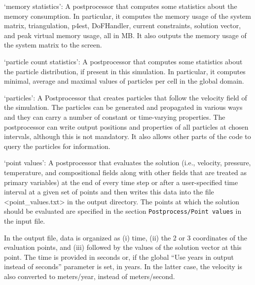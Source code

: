 \begin{itemize}
`memory statistics': A postprocessor that computes some statistics about the memory consumption. In particular, it computes the memory usage of the system matrix, triangulation, p4est, DoFHandler, current constraints, solution vector, and peak virtual memory usage, all in MB. It also outputs the memory usage of the system matrix to the screen.

`particle count statistics': A postprocessor that computes some statistics about the particle distribution, if present in this simulation. In particular, it computes minimal, average and maximal values of particles per cell in the global domain.

`particles': A Postprocessor that creates particles that follow the velocity field of the simulation. The particles can be generated and propagated in various ways and they can carry a number of constant or time-varying properties. The postprocessor can write output positions and properties of all particles at chosen intervals, although this is not mandatory. It also allows other parts of the code to query the particles for information.

`point values': A postprocessor that evaluates the solution (i.e., velocity, pressure, temperature, and compositional fields along with other fields that are treated as primary variables) at the end of every time step or after a user-specified time interval at a given set of points and then writes this data into the file <point\_values.txt> in the output directory. The points at which the solution should be evaluated are specified in the section \texttt{Postprocess/Point values} in the input file.

In the output file, data is organized as (i) time, (ii) the 2 or 3 coordinates of the evaluation points, and (iii) followed by the values of the solution vector at this point. The time is provided in seconds or, if the global ``Use years in output instead of seconds'' parameter is set, in years. In the latter case, the velocity is also converted to meters/year, instead of meters/second.



\end{itemize}
